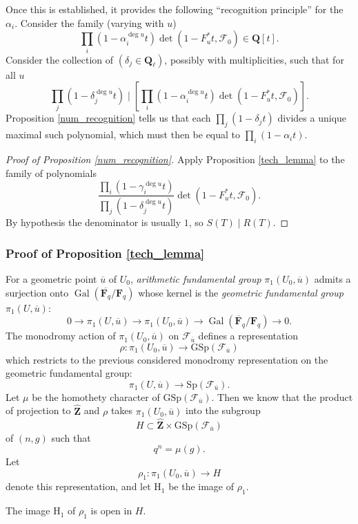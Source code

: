 \documentclass[letterpaper,11pt]{article}
\DeclareMathOperator{\Gal}{Gal}
\newcommand{\F}{\mathbf{F}}
\newcommand{\Q}{\mathbf{Q}}
\newcommand{\Z}{\mathbf{Z}}
\newcommand{\ol}[1]{\overline{#1}}
\newcommand{\wh}[1]{\widehat{#1}}
\newcommand{\Cal}[1]{\mathcal{#1}}
\newcommand{\mrm}[1]{\mathrm{#1}}
\begin{document}
Once this is established, it provides the following ``recognition principle'' for the $\alpha_i$. Consider the family (varying with $u$)
\[
\prod_i (1-\alpha_i^{\deg u} t) \det (1-F_u^* t, \Cal{F}_0) \in \Q[t].
\]
Consider the collection of $(\delta_j \in \Q_{\ell})$, possibly with multiplicities, such that for all $u$ 
\[
\prod_j (1-\delta_j^{\deg u} t)  \mid \left[ \prod_i (1-\alpha_i^{\deg u} t) \det (1-F_u^* t, \Cal{F}_0) \right].
\]
Proposition \ref{num_recognition} tells us that each $\prod_j (1-\delta_j t)  $ divides a unique maximal such polynomial, which must then be equal to $\prod_i (1-\alpha_i t) $. 

\begin{proof}[Proof of Proposition \ref{num_recognition}]
Apply Proposition \ref{tech_lemma} to the family of polynomials
\[
\frac{\prod_i (1-\gamma_i^{\deg u} t)}{\prod_j (1-\delta_j^{\deg u} t)} \det(1-F_u^* t, \Cal{F}_0).
\]
By hypothesis the denominator is usually $1$, so $S(T) \mid R(T)$. 
\end{proof}

\subsubsection{Proof of Proposition \ref{tech_lemma}}

For a geometric point $\ol{u}$ of $U_0$, \emph{arithmetic fundamental group} $\pi_1(U_0, \ol{u})$ admits a surjection onto $\Gal(\ol{\F_q}/\F_q)$ whose kernel is the \emph{geometric fundamental group} $\pi_1(U, \ol{u})$: 
\[
0 \rightarrow \pi_1(U, \ol{u}) \rightarrow \pi_1(U_0, \ol{u}) \rightarrow \Gal(\ol{\F}_q/\F_q) \rightarrow 0.
\]
The monodromy action of $\pi_1(U_0, \ol{u})$ on $\Cal{F}_{\ol{u}}$ defines a representation 
\[
\rho \colon \pi_1(U_0, \ol{u}) \rightarrow \mrm{GSp}(\Cal{F}_{\ol{u}})
\]
which restricts to the previous considered monodromy representation on the geometric fundamental group:
\[
\pi_1(U, \ol{u}) \rightarrow \mrm{Sp}(\Cal{F}_{\ol{u}}).
\]
Let $\mu$ be the homothety character of $\mrm{GSp}(\Cal{F}_{\ol{u}})$. Then we know that the product of projection to $\wh{\Z}$ and $\rho$ takes $\pi_1(U_0, \ol{u})$ into the subgroup
\[
H \subset \wh{\Z} \times \mrm{GSp}(\Cal{F}_{\ol{u}})
\]
of $(n, g)$ such that 
\[
q^n = \mu(g).
\]
Let 
\[
\rho_1 \colon \pi_1(U_0, \ol{u}) \rightarrow H
\]
denote this representation, and let $\mrm{H}_1$ be the image of $\rho_1$. 

\begin{lemma}
The image $\mrm{H}_1$ of $\rho_1$ is open in $H$. 
\end{lemma}
\end{document}
